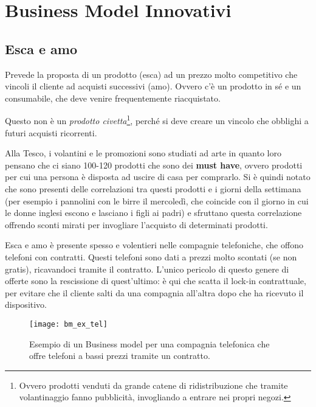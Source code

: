 \chapter{Business Model Innovativi}

\section{Esca e amo}

Prevede la proposta di un prodotto (esca) ad un prezzo molto competitivo che
vincoli il cliente ad acquisti successivi (amo). Ovvero c'è un prodotto in sé e
un consumabile, che deve venire frequentemente riacquistato.

Questo non è un \textit{prodotto civetta}\footnote{Ovvero prodotti venduti da
grande catene di ridistribuzione che tramite volantinaggio fanno pubblicità,
invogliando a entrare nei propri negozi.}, perché si deve creare un vincolo che
obblighi a futuri acquisti ricorrenti.

\begin{example}
Alla Tesco, i volantini e le promozioni sono studiati ad arte in quanto loro
pensano che ci siano 100-120 prodotti che sono dei \textbf{must have}, ovvero
prodotti per cui una persona è disposta ad uscire di casa per comprarlo. Si è
quindi notato che sono presenti delle correlazioni tra questi prodotti e i
giorni della settimana (per esempio i pannolini con le birre il mercoledì, che
coincide con il giorno in cui le donne inglesi escono e lasciano i figli ai
padri) e sfruttano questa correlazione offrendo sconti mirati per invogliare
l'acquisto di determinati prodotti.
\end{example}

\noindent Esca e amo è presente spesso e volentieri nelle compagnie
telefoniche, che offono telefoni con contratti. Questi telefoni sono dati a
prezzi molto scontati (se non gratis), ricavandoci tramite il contratto. L'unico
pericolo di questo genere di offerte sono la rescissione di quest'ultimo: è qui
che scatta il lock-in contrattuale, per evitare che il cliente salti da una
compagnia all'altra dopo che ha ricevuto il dispositivo.


\begin{figure}[t]
 \centering
 \texttt{[image: bm\_ex\_tel]}
 \caption[Business model per compagnia telefonica]{Esempio di un Business model
per una compagnia telefonica che offre telefoni a bassi prezzi tramite un
contratto.}
 \label{fig:bmi:ct}
\end{figure}

